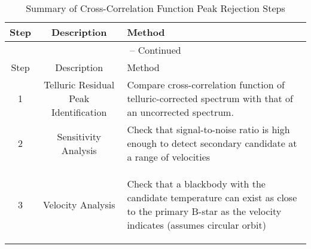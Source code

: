 \documentclass[11pt]{report}     %
\begin{document}
  
  
\begin{center}
 \begin{small}
   \begin{longtable}[h]{|ccp{6cm}|}
      \caption{Summary of Cross-Correlation Function Peak Rejection Steps} \\
        \hline
        Step  & Description & Method \\ \hline
        \endfirsthead

        \multicolumn{3}{c}{{\tablename} \thetable{} -- Continued} \\
        \hline
        Step  & Description & Method \\ \hline
        \endhead

        \hline
        \endfoot

        \hline
        \endlastfoot

        1 & Telluric Residual Peak Identification & Compare cross-correlation function of telluric-corrected spectrum with that of an uncorrected spectrum. \\

        \hline
        2 & Sensitivity Analysis & Check that signal-to-noise ratio
        is high enough to detect secondary candidate at a range of velocities \\

        \hline
        3 & Velocity Analysis & Check that a blackbody with the
        candidate temperature can exist as close to the primary B-star as the velocity indicates (assumes circular orbit)
        
        
    \label{tab:rejection}
  \end{longtable}
 \end{small}
\end{center}
\end{document}
